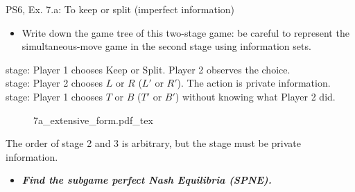 \begin{frame}{PS6, Ex. 7.a: To keep or split (imperfect information)}
  \begin{itemize}
    \item[(a)] Write down the game tree of this two-stage game: be careful to represent the simultaneous-move game in the second stage using information sets.
  \end{itemize}
  \vspace{-4pt}
   stage: Player 1 chooses Keep or Split. Player 2 observes the choice.\\\medskip
   stage: Player 2 chooses $L$ or $R$ ($L'$ or $R'$). The action is private information.\\\medskip
   stage: Player 1 chooses $T$ or $B$ ($T'$ or $B'$) without knowing what Player 2 did.
  \vspace{-4pt}
  \begin{figure}[!h]
    \center
    \def\svgwidth{.8\columnwidth}
    {7a_extensive_form.pdf_tex}
  \end{figure}
  \vspace{-2pt}
  The order of stage 2 and 3 is arbitrary, but the  stage must be private information.
  \vspace{-2pt}
  \begin{itemize}
    \item[(b)] \textbf{\textit{Find the subgame perfect Nash Equilibria (SPNE).}}
  \end{itemize}
\end{frame}


